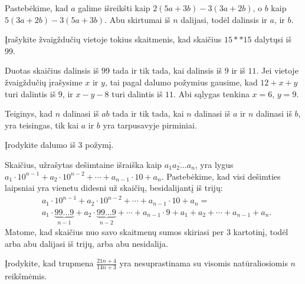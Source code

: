\begin{sprendimas}
Pastebėkime, kad $a$ galime išreikšti kaip $2(5a+3b)-3(3a+2b)$, o $b$ kaip
$5(3a+2b)-3(5a+3b)$. Abu skirtumai iš $n$ dalijasi, todėl dalinsis ir $a$,
ir $b$. 
\end{sprendimas}

\begin{pavnr}
  Įrašykite žvaigždučių vietoje tokius skaitmenis, kad skaičius $15**15$
  dalytųsi iš $99$.  
\end{pavnr}

\begin{sprendimas}
  Duotas skaičius dalinsis iš $99$ tada ir tik tada, kai dalinsis iš
  $9$ ir iš $11$. Jei vietoje žvaigždučių įrašysime $x$ ir $y$, tai pagal dalumo
  požymius gausime, kad $12+x+y$ turi dalintis iš $9$, ir $x-y-8$ turi
  dalintis iš $11$. Abi sąlygas tenkina $x=6$, $y=9$.
\end{sprendimas}

\begin{pastaba}
  Teiginys, kad $n$ dalinasi iš $ab$ tada ir tik tada, kai $n$ dalinasi iš
  $a$ ir $n$ dalinasi iš $b$, yra teisingas, tik kai $a$ ir $b$ yra
  tarpusavyje pirminiai.  
\end{pastaba}


\begin{pavnr}
  Įrodykite dalumo iš $3$ požymį. 
\end{pavnr}

\begin{sprendimas}
Skaičius, užrašytas dešimtaine išraiška kaip $\overline{a_1a_2\dots a_n}$,
yra lygus $a_1\cdot 10^{n-1} + a_2\cdot 10^{n-2} + \cdots + a_{n-1}\cdot 10 + a_n$.
Pastebėkime, kad visi dešimties laipsniai yra vienetu didesni už skaičių,
besidalijantį iš trijų:
\begin{align*}
  & a_1 \cdot 10^{n-1} + a_2  \cdot10^{n-2} + \cdots + a_{n-1} \cdot 10 + a_n = \\
  & a_1 \cdot \underbrace{99\dots 9}_{n-1} + a_2 \cdot \underbrace{99\dots 9}_{n-2} + \cdots
  + a_{n-1} \cdot 9 + a_1 + a_2 + \cdots + a_{n-1} + a_n.
\end{align*}
Matome, kad skaičius nuo savo skaitmenų sumos skiriasi per $3$ kartotinį,
todėl arba abu dalijasi iš trijų, arba abu nesidalija. 
\end{sprendimas}

\begin{pavnr}\text{\emph{[IMO 1959]}} Įrodykite, kad trupmena $\frac{21n+4}{14n+3}$ yra
  nesuprastinama su visomis natūraliosiomis $n$ reikšmėmis.
\end{pavnr}

